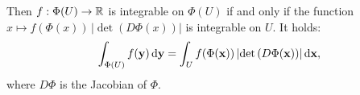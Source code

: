 Then $f:\Phi(U) \to \mathbb{R}$ is integrable on $\Phi(U)$ if and only if the function $x \mapsto f(\Phi(x))\,|\det(D\Phi(x))|$ is integrable on $U$. It holds:
\begin{equation}\label{eq:integration_transformation}
  \begin{array}{ll}
    \ds\int_{\Phi(U)} f(\bfy)\,\d \bfy = \ds\int_U f(\Phi(\bfx))\,|\det(D\Phi(\bfx))|\,\d \bfx,
  \end{array}
\end{equation}
where $D\Phi$ is the Jacobian of $\Phi$.

%

%


